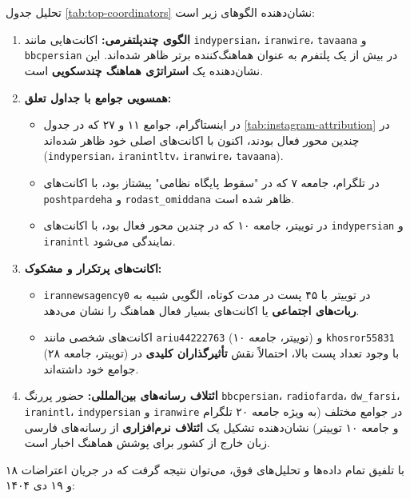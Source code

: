 \documentclass{article}
\begin{document}
	تحلیل جدول \ref{tab:top-coordinators} نشان‌دهنده الگوهای زیر است:
	
	\begin{enumerate}
		\item \textbf{الگوی چندپلتفرمی:} اکانت‌هایی مانند \texttt{indypersian}، \texttt{iranwire}، \texttt{tavaana} و \texttt{bbcpersian} در بیش از یک پلتفرم به عنوان هماهنگ‌کننده برتر ظاهر شده‌اند. این نشان‌دهنده یک \textbf{استراتژی هماهنگ چندسکویی} است.
		
		\item \textbf{همسویی جوامع با جداول تعلق:} 
		\begin{itemize}
			\item در اینستاگرام، جوامع ۱۱ و ۲۷ که در جدول \ref{tab:instagram-attribution} در چندین محور فعال بودند، اکنون با اکانت‌های اصلی خود ظاهر شده‌اند (\texttt{indypersian}، \texttt{iranintltv}، \texttt{iranwire}، \texttt{tavaana}).
			\item در تلگرام، جامعه ۷ که در "سقوط پایگاه نظامی" پیشتاز بود، با اکانت‌های \texttt{poshtpardeha} و \texttt{rodast\_omiddana} ظاهر شده است.
			\item در توییتر، جامعه ۱۰ که در چندین محور فعال بود، با اکانت‌های \texttt{indypersian} و \texttt{iranintl} نمایندگی می‌شود.
		\end{itemize}
		
		\item \textbf{اکانت‌های پرتکرار و مشکوک:} 
		\begin{itemize}
			\item \texttt{irannewsagency0} در توییتر با ۴۵ پست در مدت کوتاه، الگویی شبیه به \textbf{ربات‌های اجتماعی} یا اکانت‌های بسیار فعال هماهنگ را نشان می‌دهد.
			\item اکانت‌های شخصی مانند \texttt{ariu44222763} (توییتر، جامعه ۱۰) و \texttt{khosror55831} (توییتر، جامعه ۲۸) با وجود تعداد پست بالا، احتمالاً نقش \textbf{تأثیرگذاران کلیدی} در جوامع خود داشته‌اند.
		\end{itemize}
		
		\item \textbf{ائتلاف رسانه‌های بین‌المللی:} حضور پررنگ \texttt{bbcpersian}، \texttt{radiofarda}، \texttt{dw\_farsi}، \texttt{iranintl}، \texttt{indypersian} و \texttt{iranwire} در جوامع مختلف (به ویژه جامعه ۲۰ تلگرام و جامعه ۱۰ توییتر) نشان‌دهنده تشکیل یک \textbf{ائتلاف نرم‌افزاری} از رسانه‌های فارسی زبان خارج از کشور برای پوشش هماهنگ اخبار است.
	\end{enumerate}
با تلفیق تمام داده‌ها و تحلیل‌های فوق، می‌توان نتیجه گرفت که در جریان اعتراضات ۱۸ و ۱۹ دی ۱۴۰۴:
\end{document}

